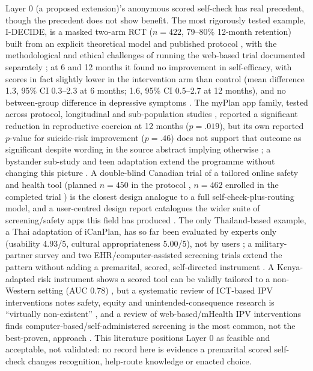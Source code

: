 \documentclass[11pt]{article}
\begin{document}
Layer 0 (a proposed extension)'s anonymous scored self-check has real precedent, though the precedent does not show benefit. The most rigorously tested example, I-DECIDE, is a masked two-arm RCT ($n=422$, 79--80\% 12-month retention) built from an explicit theoretical model and published protocol \cite{ref119,ref121}, with the methodological and ethical challenges of running the web-based trial documented separately \cite{ref122}; at 6 and 12 months it found no improvement in self-efficacy, with scores in fact slightly lower in the intervention arm than control (mean difference 1.3, 95\% CI 0.3--2.3 at 6 months; 1.6, 95\% CI 0.5--2.7 at 12 months), and no between-group difference in depressive symptoms \cite{ref120}. The myPlan app family, tested across protocol, longitudinal and sub-population studies \cite{ref123,ref126,ref127,ref128}, reported a significant reduction in reproductive coercion at 12 months ($p=.019$), but its own reported $p$-value for suicide-risk improvement ($p=.46$) does not support that outcome as significant despite wording in the source abstract implying otherwise \cite{ref124}; a bystander sub-study and teen adaptation extend the programme without changing this picture \cite{ref125,ref126}. A double-blind Canadian trial of a tailored online safety and health tool (planned $n=450$ in the protocol \cite{ref129}, $n=462$ enrolled in the completed trial \cite{ref130}) is the closest design analogue to a full self-check-plus-routing model, and a user-centred design report catalogues the wider suite of screening/safety apps this field has produced \cite{ref131}. The only Thailand-based example, a Thai adaptation of iCanPlan, has so far been evaluated by experts only (usability 4.93/5, cultural appropriateness 5.00/5), not by users \cite{ref132}; a military-partner survey and two EHR/computer-assisted screening trials extend the pattern without adding a premarital, scored, self-directed instrument \cite{ref133,ref134,ref135}. A Kenya-adapted risk instrument shows a scored tool can be validly tailored to a non-Western setting (AUC 0.78) \cite{ref136}, but a systematic review of ICT-based IPV interventions notes safety, equity and unintended-consequence research is ``virtually non-existent'' \cite{ref137}, and a review of web-based/mHealth IPV interventions finds computer-based/self-administered screening is the most common, not the best-proven, approach \cite{ref138}. This literature positions Layer 0 as feasible and acceptable, not validated: no record here is evidence a premarital scored self-check changes recognition, help-route knowledge or enacted choice.
\end{document}
